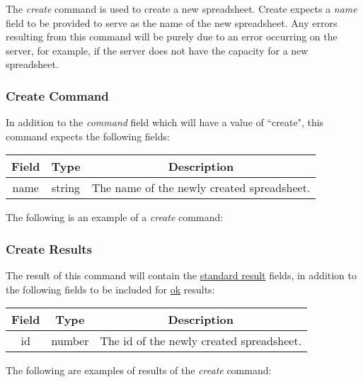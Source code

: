 The \emph{create} command is used to create a new spreadsheet. Create expects a \emph{name} 
field to be provided to serve as the name of the new spreadsheet. Any errors 
resulting from this command will be purely due to an error occurring on the 
server, for example, if the server does not have the capacity for a new 
spreadsheet.

\subsubsection{Create Command}

In addition to the \emph{command} field which will have a value of ``create", this command expects the following fields:
\begin{table}[H]
    \begin{center}
        \begin{tabular}{|c|c|c|}\hline
            Field & Type & Description \\\hline
            name & string & The name of the newly created spreadsheet. \\\hline
        \end{tabular}
    \end{center}
\end{table}

The following is an example of a \emph{create} command:


\subsubsection{Create Results}
The result of this command will contain the \hyperref[sec:message:result]{standard result} fields, in addition to the following fields to be included for \underline{ok} results:
\begin{table}[H]
    \begin{center}
        \begin{tabular}{|c|c|c|}\hline
            Field & Type & Description \\\hline
            id & number & The id of the newly created spreadsheet. \\\hline
        \end{tabular}
    \end{center}
\end{table}

The following are examples of results of the \emph{create} command:




